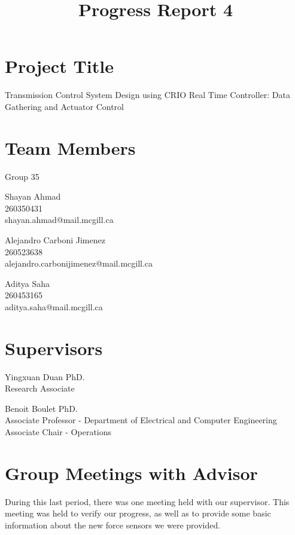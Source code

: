 \documentclass[12pt]{article}
\begin{document}
\title{Progress Report 4}
\date{}
\maketitle
\section*{Project Title} 
Transmission Control System Design using CRIO Real Time Controller:
Data Gathering and Actuator Control
\section*{Team Members}
Group 35 \newline

\hangindent=17.62482pt
Shayan Ahmad \\
260350431 \\
shayan.ahmad@mail.mcgill.ca \newline

\hangindent=17.62482pt
Alejandro Carboni Jimenez \\
260523638 \\
alejandro.carbonijimenez@mail.mcgill.ca \newline

\hangindent=17.62482pt
Aditya Saha \\
260453165 \\
aditya.saha@mail.mcgill.ca

\section*{Supervisors}
\hangindent=17.62482pt
Yingxuan Duan PhD.\\ 
Research Associate\newline 

\hangindent=17.62482pt
Benoit Boulet PhD.\\
Associate Professor - Department of Electrical and Computer Engineering\\
Associate Chair - Operations

\newpage
\section*{Group Meetings with Advisor}
During this last period, there was one meeting held with our supervisor. This 
meeting was held to verify our progress, as well as to provide some basic 
information about the new force sensors we were provided. 
\end{document}
